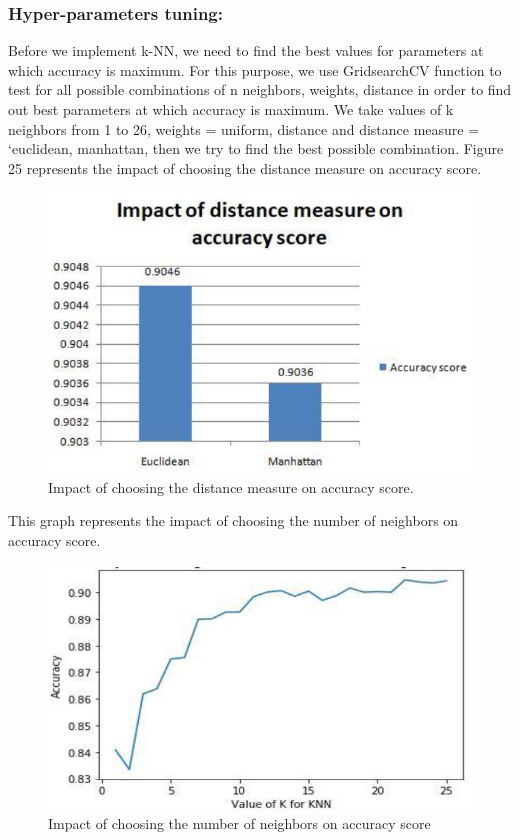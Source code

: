 \subsubsection{Hyper-parameters tuning:}

Before we implement k-NN, we need to find the best values for parameters at which accuracy is maximum. For this purpose, we use GridsearchCV function to test for all possible combinations of n neighbors, weights, distance in order to find out best parameters at which accuracy is maximum. We take values of k neighbors from 1 to 26, weights = {uniform, distance} and distance measure = {‘euclidean, manhattan}, then we try to find the best possible combination. Figure 25 represents the impact of choosing the distance measure on accuracy score.
\begin{figure}[h]
  		\centering
    		\includegraphics[scale=0.65]{./Figures/distance}
\caption{Impact of choosing the distance measure on accuracy score.}
\label{fig:2}
 		\end{figure}

This graph represents the impact of choosing the number of neighbors on accuracy score.
\begin{figure}[h]
  		\centering
    		\includegraphics[scale=0.65]{./Figures/neighbours}
\caption{Impact of choosing the number of neighbors on accuracy score}
\label{fig:3}
 		\end{figure}

